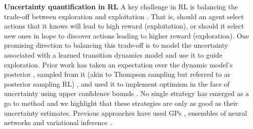 \documentclass{article}
\begin{document}
\textbf{Uncertainty quantification in RL}
A key challenge in RL is balancing the trade-off between exploration and exploitation \cite{sutton2018reinforcement}.
That is, should an agent select actions that it knows will lead to high reward (exploitation), or should it
select new ones in hope to discover actions leading to higher reward (exploration).
One promising direction to balancing this trade-off is to model the uncertainty associated with a learned transition dynamics model and use it to guide exploration.
Prior work has taken an expectation over the dynamic model's posterior \cite{deisenrothPILCO2011,kamtheDataEfficient2018,chuaDeepReinforcementLearning2018},
sampled from it (akin to Thompson sampling but referred to as posterior sampling RL)
\cite{osbandMoreEfficientReinforcement2013},
and used it to implement optimism in the face of uncertainty using upper confidence bounds \cite{curiEfficient2020}.
No single strategy has emerged as a go to method and we highlight that these strategies are only as good as their uncertainty estimates.
Previous approaches have used GPs \cite{deisenrothPILCO2011,kamtheDataEfficient2018},
ensembles of neural networks \cite{curiEfficient2020,chuaDeepReinforcementLearning2018}
and variational inference \cite{galImproving2016,houthooftVIME2017}.






\end{document}
